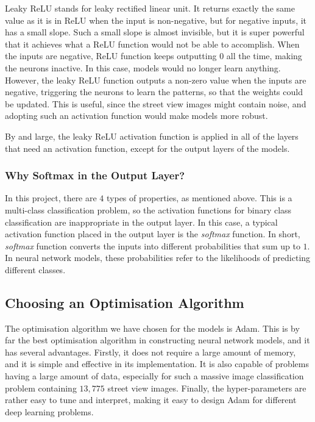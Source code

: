 \documentclass[11pt,twoside]{article}
\numberwithin{Theorem}{section}
\numberwithin{Definition}{section}
\numberwithin{Lemma}{section}
\numberwithin{Algorithm}{section}
\numberwithin{equation}{section}
\begin{document}
Leaky ReLU stands for leaky rectified linear unit. It returns exactly the same value as it is in ReLU when the input is non-negative, but for negative inputs, it has a small slope. Such a small slope is almost invisible, but it is super powerful that it achieves what a ReLU function would not be able to accomplish. When the inputs are negative, ReLU function keeps outputting $0$ all the time, making the neurons inactive. In this case, models would no longer learn anything. However, the leaky ReLU function outputs a non-zero value when the inputs are negative, triggering the neurons to learn the patterns, so that the weights could be updated. This is useful, since the street view images might contain noise, and adopting such an activation function would make models more robust. 

By and large, the leaky ReLU activation function is applied in all of the layers that need an activation function, except for the output layers of the models.

\subsubsection{Why Softmax in the Output Layer?}
In this project, there are $4$ types of properties, as mentioned above. This is a multi-class classification problem, so the activation functions for binary class classification are inappropriate in the output layer. In this case, a typical activation function placed in the output layer is the \textit{softmax} function. In short, \textit{softmax} function converts the inputs into different probabilities that sum up to $1$. In neural network models, these probabilities refer to the likelihoods of predicting different classes.

\subsection{Choosing an Optimisation Algorithm}
The optimisation algorithm we have chosen for the models is Adam. This is by far the best optimisation algorithm in constructing neural network models, and it has several advantages. Firstly, it does not require a large amount of memory, and it is simple and effective in its implementation. It is also capable of problems having a large amount of data, especially for such a massive image classification problem containing $13,775$ street view images. Finally, the hyper-parameters are rather easy to tune and interpret, making it easy to design Adam for different deep learning problems.
\end{document}
